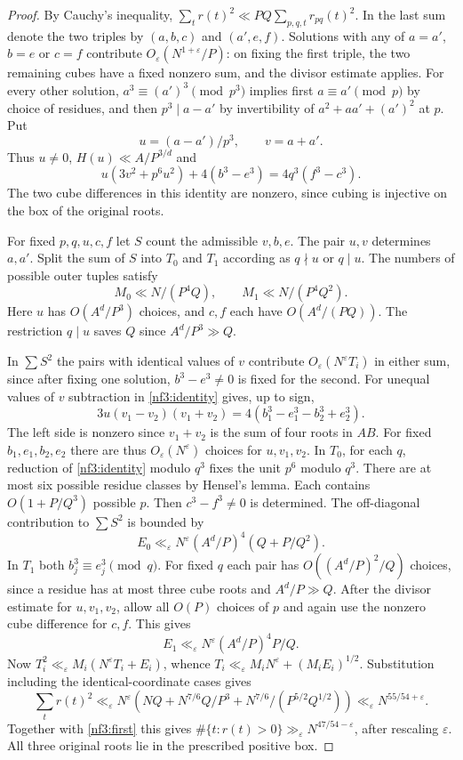 \documentclass[11pt,letterpaper]{article}
\theoremstyle{definition}
\numberwithin{equation}{section}
\begin{document}
\begin{proof}
By Cauchy's inequality,
$\sum_t r(t)^2\ll PQ\sum_{p,q,t}r_{pq}(t)^2$. In the last sum denote
the two triples by $(a,b,c)$ and $(a',e,f)$. Solutions with any of
$a=a'$, $b=e$ or $c=f$ contribute $O_\varepsilon(N^{1+\varepsilon}/P)$:
on fixing the first triple, the two remaining cubes have a fixed nonzero
sum, and the divisor estimate applies. For every other solution,
$a^3\equiv (a')^3\pmod {p^3}$ implies first $a\equiv a'\pmod p$ by
choice of residues, and then $p^3\mid a-a'$ by invertibility of
$a^2+aa'+(a')^2$ at $p$. Put
\[
 u=(a-a')/p^3,\qquad v=a+a'.
\]
Thus $u\ne0$, $H(u)\ll A/P^{3/d}$ and
\begin{equation}\label{nf3:identity}
 u(3v^2+p^6u^2)+4(b^3-e^3)=4q^3(f^3-c^3).
\end{equation}
The two cube differences in this identity are nonzero, since cubing is
injective on the box of the original roots.

For fixed $p,q,u,c,f$ let $S$ count the admissible $v,b,e$.
The pair $u,v$ determines $a,a'$. Split the sum of $S$ into $T_0$ and
$T_1$ according as $q\nmid u$ or $q\mid u$. The numbers of possible
outer tuples satisfy
\[
 M_0\ll N/(P^4Q),\qquad M_1\ll N/(P^4Q^2).
\]
Here $u$ has $O(A^d/P^3)$ choices, and $c,f$ each have $O(A^d/(PQ))$.
The restriction $q\mid u$ saves $Q$ since $A^d/P^3\gg Q$.

In $\sum S^2$ the pairs with identical values of $v$ contribute
$O_\varepsilon(N^\varepsilon T_i)$ in either sum, since after fixing one
solution, $b^3-e^3\ne0$ is fixed for the second. For unequal values of
$v$ subtraction in \eqref{nf3:identity} gives, up to sign,
\[
 3u(v_1-v_2)(v_1+v_2)=4(b_1^3-e_1^3-b_2^3+e_2^3).
\]
The left side is nonzero since $v_1+v_2$ is the sum of four roots in
$AB$. For fixed $b_1,e_1,b_2,e_2$ there are thus $O_\varepsilon(N^\varepsilon)$
choices for $u,v_1,v_2$. In $T_0$, for each $q$, reduction of
\eqref{nf3:identity} modulo $q^3$ fixes the unit $p^6$ modulo $q^3$.
There are at most six possible residue classes by Hensel's lemma.
Each contains $O(1+P/Q^3)$ possible $p$. Then $c^3-f^3\ne0$ is
determined. The off-diagonal contribution to $\sum S^2$ is bounded by
\[
 E_0\ll_\varepsilon N^\varepsilon (A^d/P)^4(Q+P/Q^2).
\]
In $T_1$ both $b_j^3\equiv e_j^3\pmod q$. For fixed $q$ each pair has
$O((A^d/P)^2/Q)$ choices, since a residue has at most three cube roots
and $A^d/P\gg Q$. After the divisor estimate for $u,v_1,v_2$, allow
all $O(P)$ choices of $p$ and again use the nonzero cube difference for
$c,f$. This gives
\[
 E_1\ll_\varepsilon N^\varepsilon (A^d/P)^4 P/Q.
\]
Now $T_i^2\ll_\varepsilon M_i(N^\varepsilon T_i+E_i)$, whence
$T_i\ll_\varepsilon M_iN^\varepsilon+(M_iE_i)^{1/2}$. Substitution
including the identical-coordinate cases gives
\[
 \sum_t r(t)^2\ll_\varepsilon N^\varepsilon
 \left(NQ+N^{7/6}Q/P^3+N^{7/6}/(P^{5/2}Q^{1/2})\right)
 \ll_\varepsilon N^{55/54+\varepsilon}.
\]
Together with \eqref{nf3:first} this gives
$\#\{t:r(t)>0\}\gg_\varepsilon N^{47/54-\varepsilon}$, after rescaling
$\varepsilon$. All three original roots lie in the prescribed positive box.
\end{proof}
\end{document}

